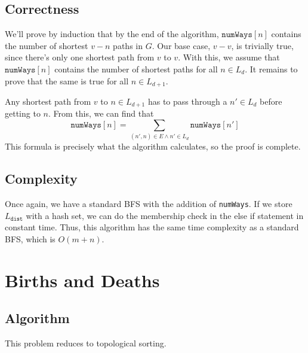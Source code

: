 \documentclass[12pt]{article}
\begin{document}
\subsection{Correctness}

We'll prove by induction that by the end of the algorithm,
$\texttt{numWays}[n]$ contains the number of shortest $v-n$ paths in $G$.
Our base case, $v-v$, is trivially true, since there's only one
shortest path from $v$ to $v$.
With this, we assume that $\texttt{numWays}[n]$ contains the number
of shortest paths for all $n \in L_d$.
It remains to prove that the same is true for all $n \in L_{d+1}$.

Any shortest path from $v$ to $n \in L_{d+1}$ has to pass
through a $n' \in L_d$ before getting to $n$.
From this, we can find that
\[\texttt{numWays}[n]=\sum_{(n', n) \in E \land n' \in L_d} \texttt{numWays}[n']\]
This formula is precisely what the algorithm calculates,
so the proof is complete.

\subsection{Complexity}

Once again, we have a standard BFS with the addition of \texttt{numWays}.
If we store $L_{\texttt{dist}}$ with a hash set, we can do the membership check
in the else if statement in constant time.
Thus, this algorithm has the same time complexity as a standard BFS,
which is $O(m+n)$.

\pagebreak

\section{Births and Deaths}

\subsection{Algorithm}

This problem reduces to topological sorting.
\end{document}
